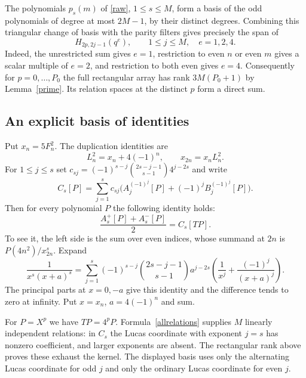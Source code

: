 \documentclass[11pt]{article}
\begin{document}
The polynomials $p_s(m)$ of \eqref{raw}, $1\le s\le M$, form a basis of the odd polynomials of degree at most $2M-1$, by their distinct degrees. Combining this triangular change of basis with the parity filters gives precisely the span of
\[
 H_{2p,2j-1}(q^e),\qquad 1\le j\le M,\quad e=1,2,4 .
\]
Indeed, the unrestricted sum gives $e=1$, restriction to even $n$ or even $m$ gives a scalar multiple of $e=2$, and restriction to both even gives $e=4$. Consequently for $p=0,\ldots,P_0$ the full rectangular array has rank $3M(P_0+1)$ by Lemma~\ref{prime}. Its relation spaces at the distinct $p$ form a direct sum.

\clearpage
\subsection*{An explicit basis of identities}
Put $x_n=5F_n^2$. The duplication identities are
\[
 L_n^2=x_n+4(-1)^n,\qquad x_{2n}=x_n L_n^2 .
\]
For $1\le j\le s$ set $c_{sj}=(-1)^{s-j}\binom{2s-j-1}{s-1}4^{j-2s}$ and write
\[
 C_s[P]=\sum_{j=1}^s c_{sj}
 \bigl(A_j^{(-1)^j}[P]+(-1)^jB_j^{(-1)^j}[P]\bigr).
\]
Then for every polynomial $P$ the following identity holds:
\begin{equation}\label{allrelations}
 \frac{A_s^+[P]+A_s^-[P]}{2}= C_s[TP].
\end{equation}
To see it, the left side is the sum over even indices, whose summand at $2n$ is $P(4n^2)/x_{2n}^s$. Expand
\[
 \frac{1}{x^s(x+a)^s}=\sum_{j=1}^s
 (-1)^{s-j}\binom{2s-j-1}{s-1}a^{j-2s}
 \left(\frac1{x^j}+\frac{(-1)^j}{(x+a)^j}\right).
\]
The principal parts at $x=0,-a$ give this identity and the difference tends to zero at infinity. Put $x=x_n$, $a=4(-1)^n$ and sum.

For $P=X^p$ we have $TP=4^pP$. Formula~\eqref{allrelations} supplies $M$ linearly independent relations: in $C_s$ the Lucas coordinate with exponent $j=s$ has nonzero coefficient, and larger exponents are absent. The rectangular rank above proves these exhaust the kernel. The displayed basis uses only the alternating Lucas coordinate for odd $j$ and only the ordinary Lucas coordinate for even $j$.
\end{document}
